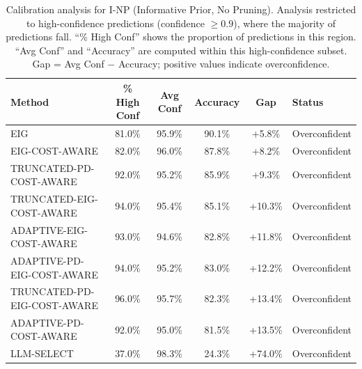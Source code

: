\begin{table}[htbp]
\centering
\small
\caption{Calibration analysis for I-NP (Informative Prior, No Pruning). Analysis restricted to high-confidence predictions (confidence $\geq 0.9$), where the majority of predictions fall. ``\% High Conf'' shows the proportion of predictions in this region. ``Avg Conf'' and ``Accuracy'' are computed within this high-confidence subset. Gap = Avg Conf $-$ Accuracy; positive values indicate overconfidence.}
\label{tab:calibration-notprune_notuniform}
\begin{tabular}{@{}lccccl@{}}
\toprule
Method & \% High Conf & Avg Conf & Accuracy & Gap & Status \\
\midrule
EIG & 81.0\% & 95.9\% & 90.1\% & +5.8\% & Overconfident \\
EIG-COST-AWARE & 82.0\% & 96.0\% & 87.8\% & +8.2\% & Overconfident \\
TRUNCATED-PD-COST-AWARE & 92.0\% & 95.2\% & 85.9\% & +9.3\% & Overconfident \\
TRUNCATED-EIG-COST-AWARE & 94.0\% & 95.4\% & 85.1\% & +10.3\% & Overconfident \\
ADAPTIVE-EIG-COST-AWARE & 93.0\% & 94.6\% & 82.8\% & +11.8\% & Overconfident \\
ADAPTIVE-PD-EIG-COST-AWARE & 94.0\% & 95.2\% & 83.0\% & +12.2\% & Overconfident \\
TRUNCATED-PD-EIG-COST-AWARE & 96.0\% & 95.7\% & 82.3\% & +13.4\% & Overconfident \\
ADAPTIVE-PD-COST-AWARE & 92.0\% & 95.0\% & 81.5\% & +13.5\% & Overconfident \\
LLM-SELECT & 37.0\% & 98.3\% & 24.3\% & +74.0\% & Overconfident \\
\bottomrule
\end{tabular}
\end{table}